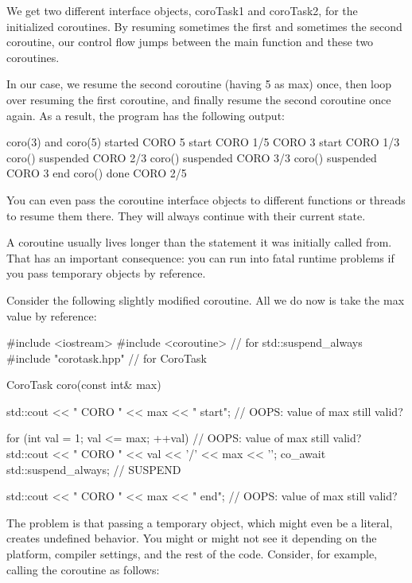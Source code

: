 We get two different interface objects, coroTask1 and coroTask2, for the initialized coroutines. By resuming sometimes the first and sometimes the second coroutine, our control flow jumps between the main function and these two coroutines.

In our case, we resume the second coroutine (having 5 as max) once, then loop over resuming the first coroutine, and finally resume the second coroutine once again. As a result, the program has the following output:

\begin{shell}
coro(3) and coro(5) started
         CORO 5 start
         CORO 1/5
         CORO 3 start
         CORO 1/3
coro() suspended
         CORO 2/3
coro() suspended
         CORO 3/3
coro() suspended
         CORO 3 end
coro() done
         CORO 2/5
\end{shell}

You can even pass the coroutine interface objects to different functions or threads to resume them there. They will always continue with their current state.


A coroutine usually lives longer than the statement it was initially called from. That has an important consequence: you can run into fatal runtime problems if you pass temporary objects by reference.

Consider the following slightly modified coroutine. All we do now is take the max value by reference:


\begin{cpp}
#include <iostream>
#include <coroutine> // for std::suspend_always{}
#include "corotask.hpp" // for CoroTask

CoroTask coro(const int& max)
{
	std::cout << "   CORO " << max << " start\n"; // OOPS: value of max still valid?
	
	for (int val = 1; val <= max; ++val) { // OOPS: value of max still valid?
		std::cout << " CORO " << val << '/' << max << '\n';
		co_await std::suspend_always{}; // SUSPEND
	}
	
	std::cout << " CORO " << max << " end\n"; // OOPS: value of max still valid?
}
\end{cpp}

The problem is that passing a temporary object, which might even be a literal, creates undefined behavior. You might or might not see it depending on the platform, compiler settings, and the rest of the code. Consider, for example, calling the coroutine as follows:


